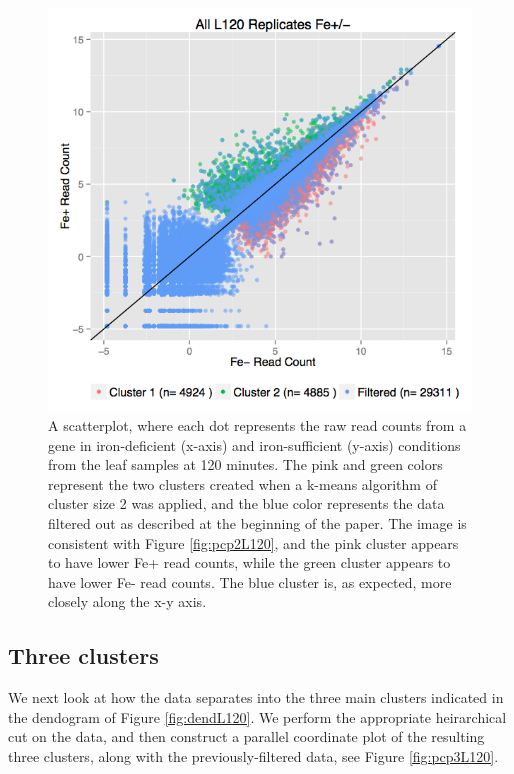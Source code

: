 \documentclass[11pt,a4paper,oldfontcommands,openany]{memoir}
\numberwithin{equation}{section} %
\begin{document}
\begin{figure}[H]
    \begin{framed}
    \centering
    \includegraphics[width=\textwidth]{scatterL120}
    \end{framed}
    \caption{A scatterplot, where each dot represents the raw read counts from a gene in iron-deficient (x-axis) and iron-sufficient (y-axis) conditions from the leaf samples at 120 minutes. The pink and green colors represent the two clusters created when a k-means algorithm of cluster size 2 was applied, and the blue color represents the data filtered out as described at the beginning of the paper. The image is consistent with Figure \ref{fig:pcp2L120}, and the pink cluster appears to have lower Fe+ read counts, while the green cluster appears to have lower Fe- read counts. The blue cluster is, as expected, more closely along the x-y axis.}
    \label{fig:scatterL120}
\end{figure}

\subsection{Three clusters}

We next look at how the data separates into the three main clusters indicated in the dendogram of Figure \ref{fig:dendL120}. We perform the appropriate heirarchical cut on the data, and then construct a parallel coordinate plot of the resulting three clusters, along with the previously-filtered data, see Figure \ref{fig:pcp3L120}.
\end{document}
